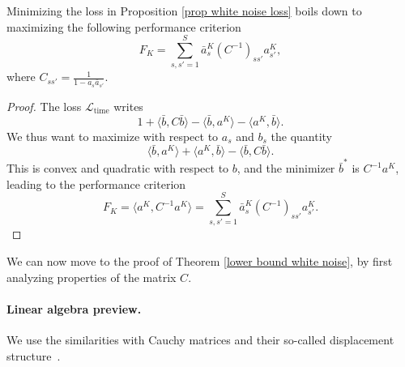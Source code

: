 \begin{proposition}
    Minimizing the loss in Proposition \ref{prop white noise loss} boils down to maximizing the following performance criterion
    \[
    F_K = \sum_{s,s'=1}^S\bar{a}_s^K(C^{-1})_{ss'}a_{s'}^K,
    \]
    where $C_{ss'} = \frac{1}{1-a_s\bar{a}_{s'}}$.
\end{proposition}
\begin{proof}
    The loss $\mathcal{L}_\text{time}$ writes 
    \[
    1 + \langle\bar{b}, C\bar{b}\rangle - \langle\bar{b}, a^K\rangle -\langle a^K, \bar{b}\rangle.
    \]
    We thus want to maximize with respect to $a_s$ and $b_s$ the quantity
    \[
    \langle\bar{b}, a^K\rangle +\langle a^K, \bar{b}\rangle - \langle\bar{b}, C\bar{b}\rangle.
    \]
    This is convex and quadratic with respect to $b$, and the minimizer $\bar{b}^*$ is $C^{-1}a^K$, leading to the performance criterion
    \[
    F_K = \langle a^K, C^{-1}a^K\rangle = \sum_{s, s'=1}^S\bar{a}_s^K(C^{-1})_{ss'}a_{s'}^K.
    \]
\end{proof}

We can now move to the proof of Theorem \ref{lower bound white noise}, by first analyzing properties of the matrix $C$.

\paragraph{Linear algebra preview.} We use the similarities with Cauchy matrices and their so-called displacement structure~\citep{yang2003generalized,calvetti1996solution}.

